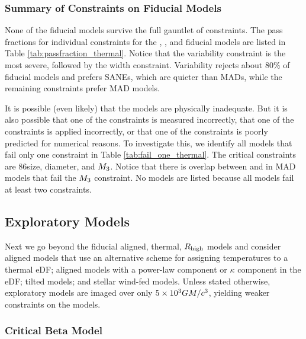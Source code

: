 \subsubsection{Summary of Constraints on Fiducial Models}
\label{sec:summarythermal}



None of the fiducial models  survive the full gauntlet of constraints.
 The pass fractions for individual constraints for the \bhac, \kharma, and \hamr fiducial models are listed in Table \ref{tab:passfraction_thermal}.
Notice that the variability constraint is the most severe, followed by the \mring width constraint.
Variability rejects about $80\%$ of fiducial models and prefers SANEs, which are quieter than MADs, while the remaining constraints prefer MAD models.

It is possible (even likely) that the models are physically inadequate.
But it is also possible that one of the constraints is measured incorrectly, that one of the constraints is applied incorrectly, or that one of the constraints is poorly predicted for numerical reasons.
To investigate this, we identify all models that fail only one constraint in Table \ref{tab:fail_one_thermal}.
The critical constraints are 86\GHz size, \mring diameter, and $M_{3}$.
Notice that there is overlap between \kharma and \bhac in MAD models that fail the $M_{3}$ constraint.
No \hamr models are listed because all \hamr models fail at least two constraints.

\subsection{Exploratory Models}\label{sec:explore}

Next we go beyond the fiducial aligned, thermal, $R_\mathrm{high}$ models and consider aligned models that use an alternative scheme for assigning temperatures to a thermal eDF; aligned models with a power-law component or $\kappa$ component in the eDF; tilted models; and stellar wind-fed models.
Unless stated otherwise, exploratory models are imaged over only $5 \times 10^3 GM/c^3$, yielding weaker constraints on the models.

\subsubsection{Critical Beta Model}

